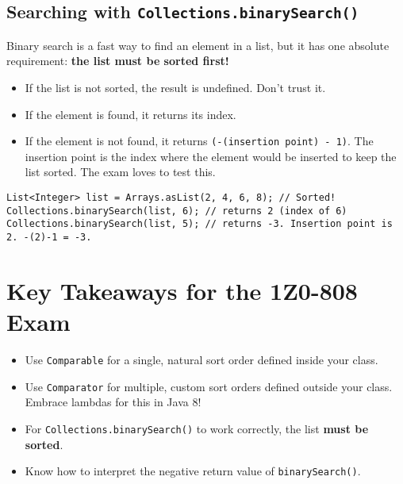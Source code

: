 \documentclass[12pt]{article}
\begin{document}
\begin{enumerate}[label=(\arabic*)]
\subsection{Searching with \texttt{Collections.binarySearch()}}
Binary search is a fast way to find an element in a list, but it has one absolute requirement: \textbf{the list must be sorted first!}
\begin{itemize}
    \item If the list is not sorted, the result is undefined. Don't trust it.
    \item If the element is found, it returns its index.
    \item If the element is not found, it returns \texttt{(-(insertion point) - 1)}. The insertion point is the index where the element would be inserted to keep the list sorted. The exam loves to test this.
\end{itemize}
\begin{verbatim}
List<Integer> list = Arrays.asList(2, 4, 6, 8); // Sorted!
Collections.binarySearch(list, 6); // returns 2 (index of 6)
Collections.binarySearch(list, 5); // returns -3. Insertion point is 2. -(2)-1 = -3.
\end{verbatim}

\section*{Key Takeaways for the 1Z0-808 Exam}
\begin{itemize}
    \item Use \texttt{Comparable} for a single, natural sort order defined inside your class.
    \item Use \texttt{Comparator} for multiple, custom sort orders defined outside your class. Embrace lambdas for this in Java 8!
    \item For \texttt{Collections.binarySearch()} to work correctly, the list \textbf{must be sorted}.
    \item Know how to interpret the negative return value of \texttt{binarySearch()}.
\end{itemize}
\end{enumerate}
\end{document}
